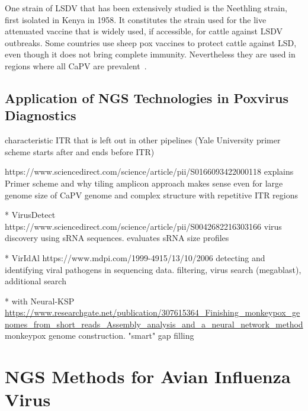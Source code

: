 One strain of LSDV that has been extensively studied is the Neethling strain, first isolated in Kenya in 1958. It constitutes the strain used for the live attenuated vaccine that is widely used, if accessible, for cattle against LSDV outbreaks. Some countries use sheep pox vaccines to protect cattle against LSD, even though it does not bring complete immunity. Nevertheless they are used in regions where all CaPV are prevalent~\cite{brenner2009appearance}.

\subsection{Application of NGS Technologies in Poxvirus Diagnostics}
characteristic ITR that is left out in other pipelines (Yale University primer scheme starts after and ends before ITR)

https://www.sciencedirect.com/science/article/pii/S0166093422000118 explains Primer scheme and why tiling amplicon approach makes sense even for large genome size of CaPV genome and complex structure with repetitive ITR regions

* VirusDetect https://www.sciencedirect.com/science/article/pii/S0042682216303166
virus discovery using sRNA sequences. evaluates sRNA size profiles

* VirIdAl https://www.mdpi.com/1999-4915/13/10/2006
detecting and identifying viral pathogens in sequencing data. filtering, virus search (megablast), additional search

* with Neural-KSP \url{https://www.researchgate.net/publication/307615364_Finishing_monkeypox_genomes_from_short_reads_Assembly_analysis_and_a_neural_network_method}
monkeypox genome construction. "smart" gap filling


\section{NGS Methods for Avian Influenza Virus}\label{sec:AIV}
